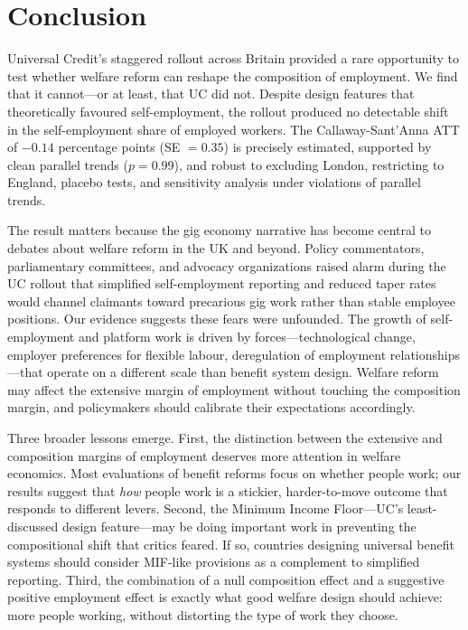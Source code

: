\documentclass[12pt]{article}
\begin{document}
\section{Conclusion}

Universal Credit's staggered rollout across Britain provided a rare opportunity to test whether welfare reform can reshape the composition of employment. We find that it cannot---or at least, that UC did not. Despite design features that theoretically favoured self-employment, the rollout produced no detectable shift in the self-employment share of employed workers. The Callaway-Sant'Anna ATT of $-0.14$ percentage points (SE $= 0.35$) is precisely estimated, supported by clean parallel trends ($p = 0.99$), and robust to excluding London, restricting to England, placebo tests, and sensitivity analysis under violations of parallel trends.

The result matters because the gig economy narrative has become central to debates about welfare reform in the UK and beyond. Policy commentators, parliamentary committees, and advocacy organizations raised alarm during the UC rollout that simplified self-employment reporting and reduced taper rates would channel claimants toward precarious gig work rather than stable employee positions. Our evidence suggests these fears were unfounded. The growth of self-employment and platform work is driven by forces---technological change, employer preferences for flexible labour, deregulation of employment relationships---that operate on a different scale than benefit system design. Welfare reform may affect the extensive margin of employment without touching the composition margin, and policymakers should calibrate their expectations accordingly.

Three broader lessons emerge. First, the distinction between the extensive and composition margins of employment deserves more attention in welfare economics. Most evaluations of benefit reforms focus on whether people work; our results suggest that \textit{how} people work is a stickier, harder-to-move outcome that responds to different levers. Second, the Minimum Income Floor---UC's least-discussed design feature---may be doing important work in preventing the compositional shift that critics feared. If so, countries designing universal benefit systems should consider MIF-like provisions as a complement to simplified reporting. Third, the combination of a null composition effect and a suggestive positive employment effect is exactly what good welfare design should achieve: more people working, without distorting the type of work they choose.
\end{document}

